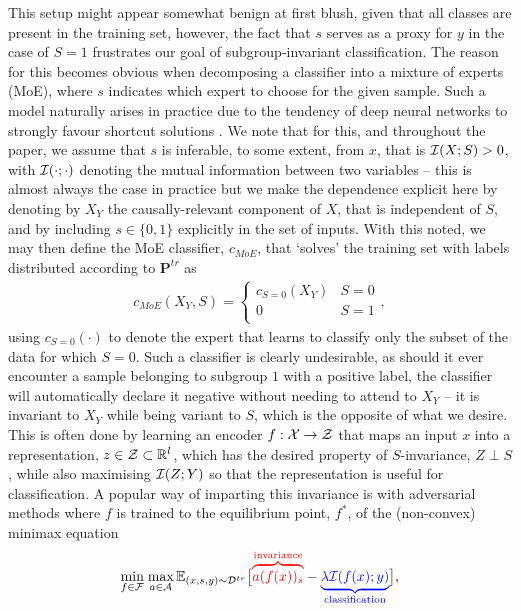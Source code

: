 %
This setup might appear somewhat benign at first blush, given that all classes are present in the
training set, however, the fact that \(s\) serves as a proxy for \(y\) in the case of $S=1$
frustrates our goal of subgroup-invariant classification. 
%
The reason for this becomes obvious when decomposing a classifier into a mixture of experts (MoE),
where \(s\) indicates which expert to choose for the given sample. 
%
Such a model naturally arises in practice due to the tendency of deep neural networks to strongly
favour shortcut solutions \citep{geirhos2020shortcut}.
%
We note that for this, and throughout the paper, we assume that \(s\) is inferable, to some extent,
from $x$, that is \( {\mathcal{I}}(X; S) > 0 \), with \( {\mathcal{I}}(\cdot; \cdot) \) denoting the mutual information
between two variables -- this is almost always the case in practice but we make the dependence
explicit here by denoting by \( X_Y \) the causally-relevant component of \( X \), that is
independent of \(S\), and by including \( s \in \{0, 1\} \) explicitly in the set of inputs.
%
With this noted, we may then define the MoE classifier, \(c_{MoE}\), that `solves' the training set
with labels distributed according to \( \mathbf{P}^{tr} \) as
%
\begin{align}
  c_{MoE}(X_Y, S) = \begin{cases}
c_{S=0}(X_Y) &S=0 \\
0 &S=1 \\
\end{cases},
\end{align}
%
using \(c_{S=0}(\cdot)\) to denote the expert that learns to classify only the subset of the data
for which $S=0$.
%
Such a classifier is clearly undesirable, as should it ever encounter a sample belonging to
subgroup $1$ with a positive label, the classifier will automatically declare it negative without
needing to attend to $X_Y$ -- it is invariant to $X_Y$ while being variant to \(S\), which is the
opposite of what we desire. 
%
This is often done by learning an encoder $f: {\mathcal{X}} \to {\mathcal{Z}}$ that maps an input $x$ into a
representation, \( z \in {\mathcal{Z}} \subset \mathbb{R}^l \), which has the desired property of \(S\)-invariance,
\( Z \perp S \), while also maximising ${\mathcal{I}}(Z; Y)$ so that the representation is useful for
classification. 
%
A popular way of imparting this invariance is with adversarial methods \citep{ganin2016domain,
zhao2018adversarial, madras2018learning} where  $f$ is trained to the equilibrium point, $f^\ast$,
of the (non-convex) minimax equation 
%
\begin{align}\label{eq:moo}
\underset{f \in {\mathcal{F}}}{\text{min}}\; \underset{a \in {\mathcal{A}}}{\text{max}}\,
\mathbb{E}_{(x, s, y) \sim {\mathcal{D}}^{tr}}
\big[ 
  \textcolor{red}{ \overbrace{ a(f(x))_s }^{ \text{invariance}} }
  - \textcolor{blue}{ \underbrace{ \lambda {\mathcal{I}}(f(x); y) }_{ \text{classification} } }
\big],
\end{align}
